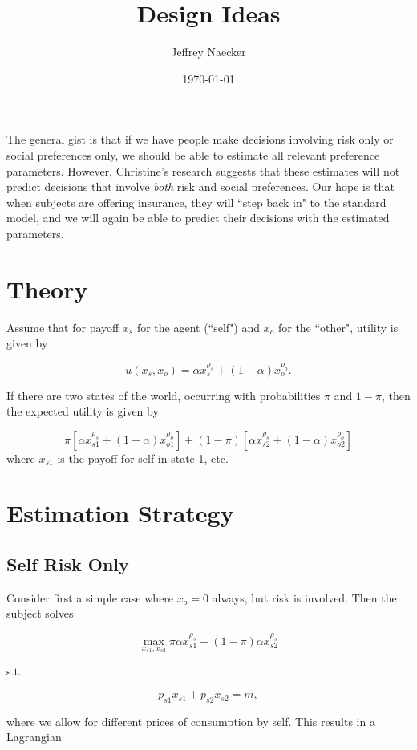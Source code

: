 \documentclass[11pt]{article}
\title{Design Ideas}
\author{Jeffrey Naecker}
\date{\today}
\begin{document}
\maketitle

The general gist is that if we have people make decisions involving risk only or social preferences only, we should be able to estimate all relevant preference parameters.  However, Christine's research suggests that these estimates will not predict decisions that involve \emph{both} risk and social preferences.  Our hope is that when subjects are offering insurance, they will ``step back in" to the standard model, and we will again be able to predict their decisions with the estimated parameters.

\section{Theory}

Assume that for payoff $x_s$ for the agent (``self") and $x_o$ for the ``other", utility is given by 

\[
u(x_s, x_o) = \alpha x_s^{\rho_s} + (1-\alpha) x_o^{\rho_o}.
\]
 
If there are two states of the world, occurring with probabilities $\pi$ and $1-\pi$, then the expected utility is given by

\[
\pi \left [ \alpha x_{s1}^{\rho_s} + (1-\alpha) x_{o1}^{\rho_o} \right ] +  (1-\pi) \left [ \alpha x_{s2}^{\rho_s} + (1-\alpha) x_{o2}^{\rho_o} \right ] 
\]
where $x_{s1}$ is the payoff for self in state 1, etc.

\section{Estimation Strategy}

\subsection{Self Risk Only}

Consider first a simple case where $x_o = 0$ always, but risk is involved.  Then the subject solves

\[
\max_{x_{s1}, x_{s2}} \pi \alpha x_{s1}^{\rho_s} + (1-\pi) \alpha x_{s2}^{\rho_s} 
\]

s.t.

\[
p_{s1} x_{s1} + p_{s2} x_{s2}  = m,
\]

where we allow for different prices of consumption by self.  This results in a Lagrangian
\end{document}
